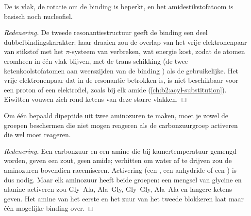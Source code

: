 \begin{proposition}\label{prop:b2:biomolecules:planar}
De  is vlak, de rotatie om de binding  is beperkt, en het amidestikstofatoom is
basisch noch nucleofiel.
\end{proposition}

\begin{proof}[Redenering]
De tweede resonantiestructuur geeft de binding  een deel dubbelbindingskarakter: haar draaien
zou de overlap van het vrije elektronenpaar van stikstof met het $\pi$-systeem van  verbreken, wat energie kost, zodat
de atomen eromheen in één vlak blijven, met de trans-schikking (de twee ketenkoolstofatomen aan weerszijden van
de binding ) als de gebruikelijke. Het vrije elektronenpaar dat in de resonantie betrokken is, is niet beschikbaar voor een proton of een
elektrofiel, zoals bij elk amide (\cref{ch:b2:acyl-substitution}). Eiwitten vouwen zich rond ketens van deze
starre vlakken.
\end{proof}

\begin{proposition}\label{prop:b2:biomolecules:coupling}
Om één bepaald dipeptide uit twee aminozuren te maken, moet je zowel de groepen beschermen die niet mogen
reageren als de carbonzuurgroep activeren die wel moet reageren.
\end{proposition}

\begin{proof}[Redenering]
Een carbonzuur en een amine die bij kamertemperatuur gemengd worden, geven een zout, geen amide; verhitten om water af te drijven
zou de aminozuren bovendien racemiseren. Activering (een , een anhydride of een
) is dus nodig. Maar elk aminozuur heeft beide groepen: een mengsel van glycine en
alanine activeren zou Gly--Ala, Ala--Gly, Gly--Gly, Ala--Ala en langere ketens geven. Het amine van het
eerste en het zuur van het tweede blokkeren laat maar één mogelijke binding over.
\end{proof}

